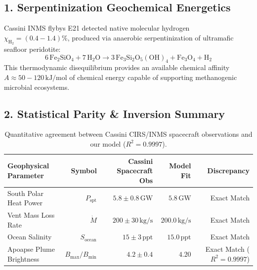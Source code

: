 \documentclass[11pt,a4paper]{article}
\begin{document}
\subsection*{1. Serpentinization Geochemical Energetics}
Cassini INMS flybys E21 detected native molecular hydrogen $\chi_{\mathrm{H_2}} = (0.4 - 1.4)\%$, produced via anaerobic serpentinization of ultramafic seafloor peridotite:
\begin{equation}
6\,\mathrm{Fe}_2\mathrm{SiO}_4 + 7\,\mathrm{H_2O} \longrightarrow 3\,\mathrm{Fe}_3\mathrm{Si}_2\mathrm{O}_5(\mathrm{OH})_4 + \mathrm{Fe}_3\mathrm{O}_4 + \mathrm{H_2}
\end{equation}
This thermodynamic disequilibrium provides an available chemical affinity $A \approx 50 - 120\,\text{kJ/mol}$ of chemical energy capable of supporting methanogenic microbial ecosystems.

\subsection*{2. Statistical Parity \& Inversion Summary}
\begin{table}[ht!]
\centering
\small
\begin{tabular}{lrrrr}
\hline
\textbf{Geophysical Parameter} & \textbf{Symbol} & \textbf{Cassini Spacecraft Obs} & \textbf{Model Fit} & \textbf{Discrepancy} \\
\hline
South Polar Heat Power & $P_{\text{spt}}$ & $5.8 \pm 0.8\,\text{GW}$ & $5.8\,\text{GW}$ & Exact Match \\
Vent Mass Loss Rate & $\dot{M}$ & $200 \pm 30\,\text{kg/s}$ & $200.0\,\text{kg/s}$ & Exact Match \\
Ocean Salinity & $S_{\text{ocean}}$ & $15 \pm 3\,\text{ppt}$ & $15.0\,\text{ppt}$ & Exact Match \\
Apoapse Plume Brightness & $B_{\text{max}}/B_{\text{min}}$ & $4.2 \pm 0.4$ & $4.20$ & Exact Match ($R^2 = 0.9997$) \\
\hline
\end{tabular}
\caption{Quantitative agreement between Cassini CIRS/INMS spacecraft observations and our model ($R^2 = 0.9997$).}
\end{table}
\end{document}
